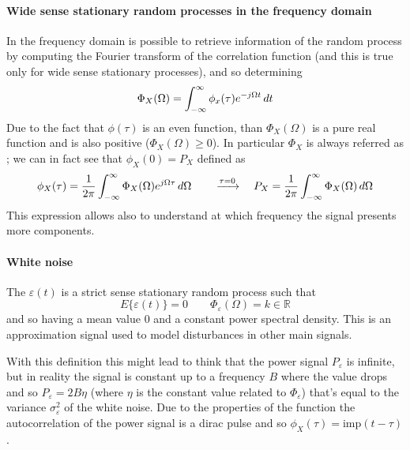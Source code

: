 	\paragraph{Wide sense stationary random processes in the frequency domain} In the frequency domain is possible to retrieve information of the random process by computing the Fourier transform of the correlation function (and this is true only for wide sense stationary processes), and so determining
	\begin{equation} \label{eq:prob:psd}
		 \Phi_X(\Omega) = \int_{-\infty}^\infty \phi_x(\tau) e^{-j\Omega t}\, dt
	\end{equation} 
	Due to the fact that $\phi(\tau)$ is an even function, than $\Phi_X(\Omega)$ is a pure real function and is also positive ($\Phi_X(\Omega) \geq 0$). In particular $\Phi_X$ is always referred as ; we can in fact see that $\phi_X(0) = P_X$ defined as
	\[ \phi_X(\tau)= \frac 1 {2\pi} \int_{-\infty}^\infty \Phi_X(\Omega) e^{j\Omega \tau} \, d\Omega \qquad \xrightarrow{\tau = 0} \quad P_X = \frac 1 {2\pi} \int_{-\infty}^\infty \Phi_X(\Omega) \, d\Omega \]
	This expression allows also to understand at which frequency the signal presents more components.
	
	\paragraph{White noise}  The  $\varepsilon(t)$ is a strict sense stationary random process such that 
	\[ E\{ \varepsilon(t) \} = 0 \qquad \Phi_\varepsilon(\Omega) = k \in \mathds R \]
	and so having a mean value 0 and a constant power spectral density. This is an approximation signal used to model disturbances in other main signals. 
	
	With this definition this might lead to think that the power signal $P_\varepsilon$ is infinite, but in reality the signal is constant up to a frequency $B$ where the value drops and so $P_\varepsilon = 2B \eta$ (where $\eta$ is the constant value related to $\Phi_\varepsilon$) that's equal to the variance $\sigma_\varepsilon^2$ of the white noise. Due to the properties of the function the autocorrelation of the power signal is a dirac pulse and so $\phi_X(\tau) = \textrm{imp}(t-\tau)$.
	
	
	
	
	
	
	
	
	
	
	
	
	
	
	
	
	
	
	
	
	
	
	
	
	
	
	
	
	